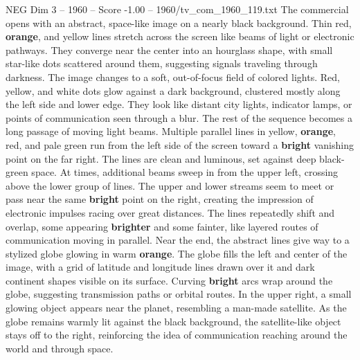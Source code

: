 \begin{textsample}{NEG Dim 3 – 1960 – Score -1.00 – 1960/tv\_com\_1960\_119.txt}  \label{ex:f3_neg_078}
The commercial opens with an abstract, space-like image on a nearly black background.
Thin red, \textbf{orange}, and yellow lines stretch across the screen like beams of light or electronic pathways.
They converge near the center into an hourglass shape, with small star-like dots scattered around them, suggesting signals traveling through darkness.
The image changes to a soft, out-of-focus field of colored lights.
Red, yellow, and white dots glow against a dark background, clustered mostly along the left side and lower edge.
They look like distant city lights, indicator lamps, or points of communication seen through a blur.
The rest of the sequence becomes a long passage of moving light beams.
Multiple parallel lines in yellow, \textbf{orange}, red, and pale green run from the left side of the screen toward a \textbf{bright} vanishing point on the far right.
The lines are clean and luminous, set against deep black-green space.
At times, additional beams sweep in from the upper left, crossing above the lower group of lines.
The upper and lower streams seem to meet or pass near the same \textbf{bright} point on the right, creating the impression of electronic impulses racing over great distances.
The lines repeatedly shift and overlap, some appearing \textbf{brighter} and some fainter, like layered routes of communication moving in parallel.
Near the end, the abstract lines give way to a stylized globe glowing in warm \textbf{orange}.
The globe fills the left and center of the image, with a grid of latitude and longitude lines drawn over it and dark continent shapes visible on its surface.
Curving \textbf{bright} arcs wrap around the globe, suggesting transmission paths or orbital routes.
In the upper right, a small glowing object appears near the planet, resembling a man-made satellite.
As the globe remains warmly lit against the black background, the satellite-like object stays off to the right, reinforcing the idea of communication reaching around the world and through space.

\end{textsample}
